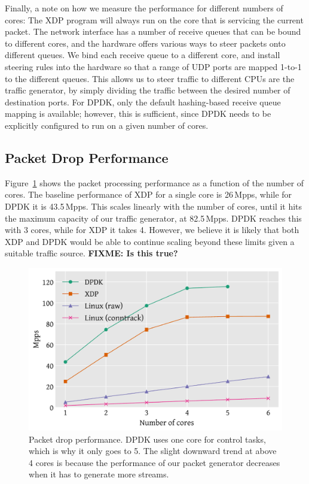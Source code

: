 \documentclass[10pt,sigconf]{acmart}
\begin{document}
Finally, a note on how we measure the performance for different numbers of
cores: The XDP program will always run on the core that is servicing the current
packet. The network interface has a number of receive queues that can be bound
to different cores, and the hardware offers various ways to steer packets onto
different queues. We bind each receive queue to a different core, and install
steering rules into the hardware so that a range of UDP ports are mapped 1-to-1
to the different queues. This allows us to steer traffic to different CPUs are
the traffic generator, by simply dividing the traffic between the desired number
of destination ports. For DPDK, only the default hashing-based receive queue
mapping is available; however, this is sufficient, since DPDK needs to be
explicitly configured to run on a given number of cores.

\subsection{Packet Drop Performance}
\label{sec:basel-pack-proc}
Figure~\ref{fig:drop-test} shows the packet processing performance as a function
of the number of cores. The baseline performance of XDP for a single core is
26\,Mpps, while for DPDK it is 43.5\,Mpps. This scales linearly with the number
of cores, until it hits the maximum capacity of our traffic generator, at
82.5\,Mpps. DPDK reaches this with 3 cores, while for XDP it takes 4. However,
we believe it is likely that both XDP and DPDK would be able to continue scaling
beyond these limits given a suitable traffic source. \textbf{FIXME: Is this
  true?}

\begin{figure}[t]
\centering
\includegraphics[width=\linewidth]{figures/drop-test.pdf}
\caption{\label{fig:drop-test} Packet drop performance. DPDK uses one core for
  control tasks, which is why it only goes to 5. The slight downward trend at
  above 4 cores is because the performance of our packet generator decreases
  when it has to generate more streams.}
\end{figure}
\end{document}

